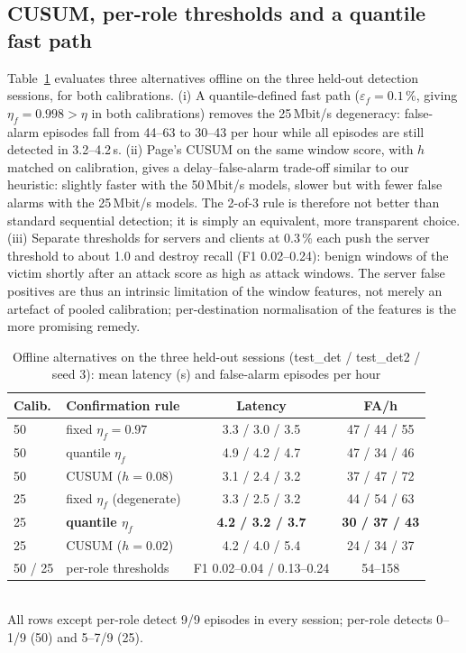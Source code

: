 \documentclass[conference]{IEEEtran}
\begin{document}
\subsection{CUSUM, per-role thresholds and a quantile fast path}\label{sec:cusum}
Table~\ref{tab:cusum} evaluates three alternatives offline on the three held-out detection sessions, for both calibrations. (i) A quantile-defined fast path ($\varepsilon_f=0.1\,\%$, giving $\eta_f=0.998>\eta$ in both calibrations) removes the 25\,Mbit/s degeneracy: false-alarm episodes fall from 44--63 to 30--43 per hour while all episodes are still detected in 3.2--4.2\,s. (ii) Page's CUSUM on the same window score, with $h$ matched on calibration, gives a delay--false-alarm trade-off similar to our heuristic: slightly faster with the 50\,Mbit/s models, slower but with fewer false alarms with the 25\,Mbit/s models. The 2-of-3 rule is therefore not better than standard sequential detection; it is simply an equivalent, more transparent choice. (iii) Separate thresholds for servers and clients at 0.3\,\% each push the server threshold to about 1.0 and destroy recall (F1 0.02--0.24): benign windows of the victim shortly after an attack score as high as attack windows. The server false positives are thus an intrinsic limitation of the window features, not merely an artefact of pooled calibration; per-destination normalisation of the features is the more promising remedy.

\begin{table}[t]
\caption{Offline alternatives on the three held-out sessions (test\_det / test\_det2 / seed 3): mean latency (s) and false-alarm episodes per hour}
\label{tab:cusum}
\centering
\footnotesize
\setlength{\tabcolsep}{2pt}
\begin{tabular}{llcc}
\toprule
Calib. & Confirmation rule & Latency & FA/h \\
\midrule
50 & fixed $\eta_f=0.97$ & 3.3 / 3.0 / 3.5 & 47 / 44 / 55 \\
50 & quantile $\eta_f$ & 4.9 / 4.2 / 4.7 & 47 / 34 / 46 \\
50 & CUSUM ($h=0.08$) & 3.1 / 2.4 / 3.2 & 37 / 47 / 72 \\
25 & fixed $\eta_f$ (degenerate) & 3.3 / 2.5 / 3.2 & 44 / 54 / 63 \\
25 & \textbf{quantile $\eta_f$} &\textbf{4.2 / 3.2 / 3.7} & \textbf{30 / 37 / 43} \\
25 & CUSUM ($h=0.02$) & 4.2 / 4.0 / 5.4 & 24 / 34 / 37 \\
\midrule
50 / 25 & per-role thresholds & F1 0.02--0.04 / 0.13--0.24 & 54--158 \\
\bottomrule
\end{tabular}\\[2pt]
\footnotesize All rows except per-role detect 9/9 episodes in every session; per-role detects 0--1/9 (50) and 5--7/9 (25).
\end{table}
\end{document}

